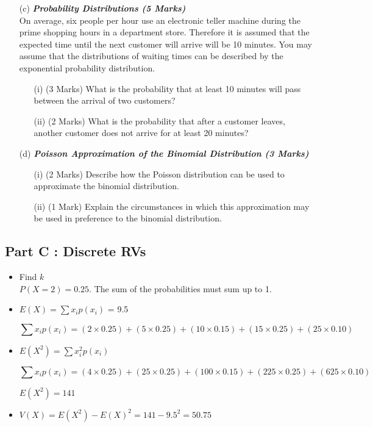 \begin{itemize}



\item[(c)] \textbf{\textit{Probability Distributions (5 Marks)}}\\ On average, six people per hour use an electronic teller machine during the prime shopping hours in a department store. Therefore it is assumed that the expected time until the next customer will arrive will be 10 minutes. You may assume that the distributions of waiting times can be described by the exponential probability distribution.

\begin{itemize}
\item[(i)] (3 Marks) What is the probability that at least 10 minutes will pass between the arrival of two customers?
\item[(ii)] (2 Marks) What is the probability that after a customer leaves, another customer does not arrive for at least 20 minutes?
\end{itemize}
\item[(d)] \textbf{\textit{Poisson Approximation of the Binomial Distribution (3 Marks)}}
\begin{itemize}
\item[(i)] (2 Marks) Describe how the Poisson distribution can be used to approximate the binomial distribution.
\item[(ii)] (1 Mark) Explain the circumstances in which this approximation may be used in preference to the binomial distribution.
\end{itemize}
\end{itemize}


\subsection*{Part C : Discrete RVs}
\begin{itemize}
\item Find $k$\\
$P(X=2) = 0.25$. The sum of the probabilities must sum up to 1.

\item $E(X) = \sum x_i p(x_i)$ = 9.5

\[\sum x_i p(x_i) = (2\times 0.25) + (5 \times 0.25) + (10 \times 0.15) + (15 \times 0.25) + (25 \times 0.10) \]



\item $E(X^2) = \sum x^2_i p(x_i)$

\[\sum x_i p(x_i) = (4\times 0.25) + (25 \times 0.25) + (100 \times 0.15) + (225 \times 0.25) + (625 \times 0.10) \]


$E(X^2) = 141$

\item $V(X) = E(X^2) - E(X)^2 = 141-9.5^2 = 50.75$
\end{itemize}


